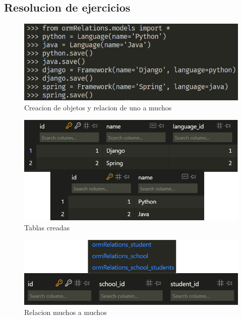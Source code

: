 \documentclass{article}
\begin{document}
    \subsection{Resolucion de ejercicios}
        \begin{figure}
            \centering
            \includegraphics[width=150mm]{img/img1.png}
            \caption{Creacion de objetos y relacion de uno a muchos}
            \label{fig:enter-label}
        \end{figure}
        \begin{figure}
            \centering
            \includegraphics[width=150mm]{img/img2.png}
            \caption{Tablas creadas}
            \label{fig:enter-label}
        \end{figure}
        \begin{figure}
            \centering
            \includegraphics[width=150mm]{img/img3.png}
            \caption{Relacion muchos a muchos}
            \label{fig:enter-label}
        \end{figure}
\end{document}
